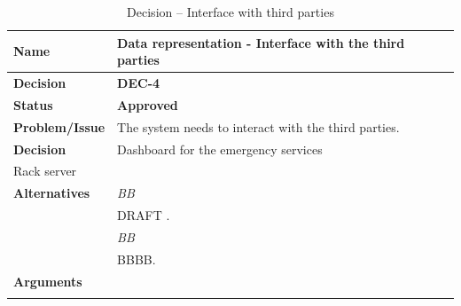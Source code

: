 \begin{table}[h!]
\begin{tabular}{L{0.2\textwidth} L{0.6\textwidth}}
    \textbf{Name} 			& \textbf{Data representation - Interface with the third parties} \\ \toprule
    \textbf{Decision} 		& \textbf{DEC-4}\\ \midrule
    \textbf{Status} 		& \textbf{Approved} \\ \midrule
    \textbf{Problem/Issue} 	& The system needs to interact with the third parties. \\ \midrule
    \textbf{Decision} 		& Dashboard for the emergency services\\ Rack server \\ \midrule
    \textbf{Alternatives} 	& \textit{BB}\\
    						& DRAFT .\\
    						& \textit{BB}\\
    						& BBBB.\\
    						\midrule
    \textbf{Arguments} 		& \\

    \\ \bottomrule
\end{tabular}
\caption{Decision -- Interface with third parties}
\label{table:linux}
\end{table}



